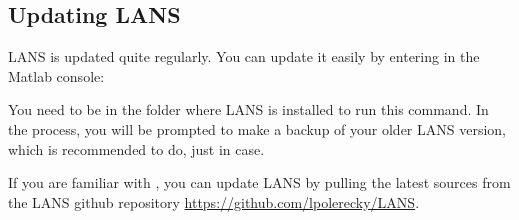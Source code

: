 
\subsection{Updating LANS}
\setcounter{step}{0}

\s LANS is updated quite regularly. You can update it easily by entering in the Matlab console:


\bul You need to be in the folder where LANS is installed to run this command. In the process, you will be prompted to make a backup of your older LANS version, which is recommended to do, just in case.

\bul If you are familiar with , you can update LANS by pulling the latest sources from the LANS github repository \url{https://github.com/lpolerecky/LANS}.

